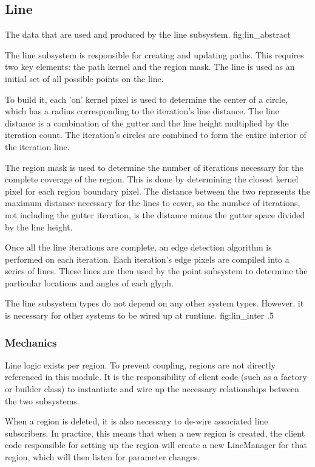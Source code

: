 \subsection{Line}

{The data that are used and produced by the line subsystem.}
{fig:lin_abstract}

The line subsystem is responsible for creating and updating paths.
This requires two key elements: the path kernel and the region mask.
The line is used as an initial set of all possible points on the line.

To build it, each 'on' kernel pixel is used to determine the center of a circle, which has a radius corresponding to the iteration's line distance.
The line distance is a combination of the gutter and the line height multiplied by the iteration count.
The iteration's circles are combined to form the entire interior of the iteration line.

The region mask is used to determine the number of iterations necessary for the complete coverage of the region.
This is done by determining the closest kernel pixel for each region boundary pixel.
The distance between the two represents the maximum distance necessary for the lines to cover, so the number of iterations, not including the gutter iteration, is the distance minus the gutter space divided by the line height.

Once all the line iterations are complete, an edge detection algorithm is performed on each iteration.
Each iteration's edge pixels are compiled into a series of lines.
These lines are then used by the point subsystem to determine the particular locations and angles of each glyph.

{The line subsystem types do not depend on any other system types.  However, it is necessary for other systems to be wired up at runtime.}
{fig:lin_inter}
{.5}


\subsubsection{Mechanics}
Line logic exists per region.
To prevent coupling, regions are not directly referenced in this module.
It is the responsibility of client code (such as a factory or builder class) to instantiate and wire up the necessary relationships between the two subsystems.

When a region is deleted, it is also necessary to de-wire associated line subscribers.
In practice, this means that when a new region is created, the client code responsible for setting up the region will create a new LineManager for that region, which will then listen for parameter changes.

